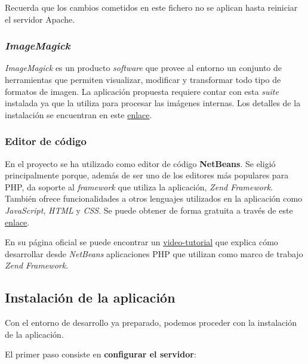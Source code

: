 \documentclass[
]{article}
\begin{document}
Recuerda que los cambios cometidos en este fichero no se aplican hasta
reiniciar el servidor Apache.

\hypertarget{imagemagick}{%
\subsubsection{\texorpdfstring{\emph{ImageMagick}}{ImageMagick}}\label{imagemagick}}

\emph{ImageMagick} es un producto \emph{software} que provee al entorno
un conjunto de herramientas que permiten visualizar, modificar y
transformar todo tipo de formatos de imagen. La aplicación propuesta
requiere contar con esta \emph{suite} instalada ya que la utiliza para
procesar las imágenes internas. Los detalles de la instalación se
encuentran en este
\href{https://imagemagick.org/script/install-source.php}{enlace}.

\hypertarget{editor-de-cuxf3digo}{%
\subsubsection{Editor de código}\label{editor-de-cuxf3digo}}

En el proyecto se ha utilizado como editor de código \textbf{NetBeans}.
Se eligió principalmente porque, además de ser uno de los editores más
populares para PHP, da soporte al \emph{framework} que utiliza la
aplicación, \emph{Zend Framework}. También ofrece funcionalidades a
otros lenguajes utilizados en la aplicación como \emph{JavaScript},
\emph{HTML} y \emph{CSS}. Se puede obtener de forma gratuita a través de
este
\href{https://netbeans.org/community/releases/82/install.html}{enlace}.

En su página oficial se puede encontrar un
\href{https://netbeans.org/kb/docs/php/zend-framework-screencast.html}{video-tutorial}
que explica cómo desarrollar desde \emph{NetBeans} aplicaciones PHP que
utilizan como marco de trabajo \emph{Zend Framework}.

\hypertarget{instalaciuxf3n-de-la-aplicaciuxf3n}{%
\subsection{Instalación de la
aplicación}\label{instalaciuxf3n-de-la-aplicaciuxf3n}}

Con el entorno de desarrollo ya preparado, podemos proceder con la
instalación de la aplicación.

El primer paso consiste en \textbf{configurar el servidor}:
\end{document}
